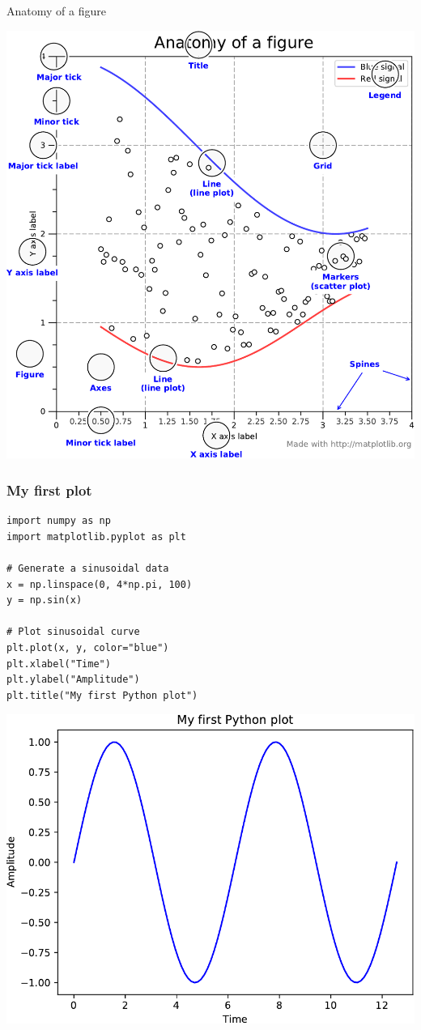 \documentclass[pdf]{beamer}
\begin{document}
\begin{frame}{Anatomy of a figure}

\begin{center}
	\includegraphics[width=.6\textwidth]{anatomy_figure.pdf}
\end{center}
\end{frame}

\begin{frame}[fragile]
\frametitle{My first plot}

\begin{lstlisting}[style=python]
import numpy as np
import matplotlib.pyplot as plt

# Generate a sinusoidal data
x = np.linspace(0, 4*np.pi, 100)
y = np.sin(x)

# Plot sinusoidal curve
plt.plot(x, y, color="blue")
plt.xlabel("Time")
plt.ylabel("Amplitude")
plt.title("My first Python plot")
\end{lstlisting}

\vspace{-0.5cm}
\begin{center}
	\includegraphics[width=.35\textwidth]{plot1.pdf}
\end{center}

\end{frame}
\end{document}
